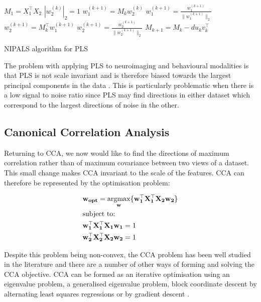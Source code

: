 \vspace{\baselineskip}
\begin{algorithm}
\begin{algorithmic}
\STATE $M_1=X_1^{\top}X_2$
     $|w^{(k)}_2|_2=1$
        \STATE $w^{(k+1)}_1=M_kw^{(k)}_2$
        \STATE $w^{(k+1)}_1=\frac{w^{(k+1)}_1}{\|w^{(k+1)}_1\|_2}$
        \STATE $w^{(k+1)}_2=M_k^{\top}w^{(k+1)}_1$
        \STATE $w^{(k+1)}_2=\frac{w^{(k+1)}_2}{\|w^{(k+1)}_2\|_2}$
        \STATE$M_{k+1}=M_k-du_kv_k^{\top}$
    \ENDWHILE
\ENDFOR
\caption[NIPALS for PLS]{NIPALS algorithm for PLS}
\label{alg:NIPALS}
\end{algorithmic}
\end{algorithm}

The problem with applying PLS to neuroimaging and behavioural modalities is that PLS is not scale invariant and is therefore biased towards the largest principal components in the data \cite{helmer2020stability}. This is particularly problematic when there is a low signal to noise ratio since PLS may find directions in either dataset which correspond to the largest directions of noise in the other.

\subsection{Canonical Correlation Analysis}\label{sec:cca}

Returning to CCA, we now would like to find the directions of maximum correlation rather than of maximum covariance between two views of a dataset. This small change makes CCA invariant to the scale of the features. CCA can therefore be represented by the optimisation problem:

\begin{align}
    & \bold{w_{opt}}=\underset{\bold{w}}{\mathrm{argmax}}\{ \bold{w_1^{\top}X_1^{\top}X_2w_2}  \}\\
    & \text{subject to:} \notag\\
    & \bold{w_1^{\top}X_1^{\top}X_1w_1}=1 \notag\\
    & \bold{w_2^{\top}X_2^{\top}X_2w_2}=1 \notag
\end{align}

Despite this problem being non-convex, the CCA problem has been well studied in the literature and there are a number of other ways of forming and solving the CCA objective. CCA can be formed as an iterative optimisation using an eigenvalue problem, a generalised eigenvalue problem, block coordinate descent by alternating least squares regressions \cite{golub1995canonical} \cite{sun2008least} or by gradient descent \cite{via2007learning}.

